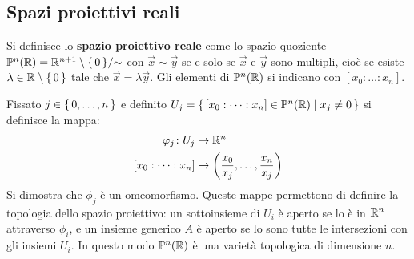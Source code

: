 \subsection{Spazi proiettivi reali}


\begin{definition}
  Si definisce lo \textbf{spazio proiettivo reale} come lo spazio quoziente $ \mathbb{P}^{n} (\mathbb{R}) = {\mathbb{R}^{n+1} \setminus \set{0}} \slash {\sim} $ con
  $ \vec{x} \sim \vec{y} $ se e solo se $ \vec{x} $ e $ \vec{y} $ sono multipli,
  cioè se esiste $ \lambda \in \mathbb{R}^{} \setminus \set{0} $ tale che $ \vec{x} = \lambda \vec{y} $.
  Gli elementi di $ \mathbb{P}^{n} (\mathbb{R}) $ si indicano con $ [x_0 : \dots : x_n] $.
\end{definition}
Fissato $ j \in \set{0, \dots, n} $ e definito
$ U_j = \set{[x_0 : \dots : x_n] \in \mathbb{P}^{n} (\mathbb{R}) | x_j \not = 0 } $ si definisce la mappa:
\begin{align*}
  \varphi_j \colon U_j & \to \mathbb{R}^{n} \\
  [x_0 : \dots : x_n] & \mapsto \left(\frac{x_0}{x_j}, \dots, \frac{x_n}{x_j}\right)
\end{align*}
Si dimostra che $ \phi_j $ è un omeomorfismo. Queste mappe permettono di definire la
topologia dello spazio proiettivo: un sottoinsieme di $ U_i $ è aperto se lo è
in $ \mathbb{R}^{n} $ attraverso $ \phi_i $, e un insieme generico $ A $ è aperto se lo
sono tutte le intersezioni con gli insiemi $ U_i $. In questo modo $ \mathbb{P}^{n} (\mathbb{R}) $ è
una varietà topologica di dimensione $ n $.

